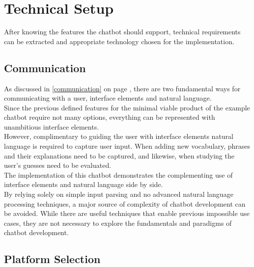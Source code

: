 \section{Technical Setup}


After knowing the features the chatbot should support,
technical requirements can be extracted
and appropriate technology chosen for the implementation.


\subsection{Communication}

As discussed in \ref{communication} on page \pageref{communication},
there are two fundamental ways for communicating with a user,
interface elements and natural language.
\\
Since the previous defined features for the minimal viable product of the example chatbot require not many options,
everything can be represented with unambitious interface elements.
\\
However, complimentary to guiding the user with interface elements
natural language is required to capture user input.
When adding new vocabulary, phrases and their explanations need to be captured,
and likewise, when studying the user's guesses need to be evaluated.
\\
The implementation of this chatbot demonstrates the complementing use of interface elements and natural language side by side.
\\
By relying solely on simple input parsing and no advanced natural language processing techniques,
a major source of complexity of chatbot development can be avoided.
While there are useful techniques that enable previous impossible use cases,
they are not necessary to explore the fundamentals and paradigms of chatbot development.
\\

\subsection{Platform Selection}

